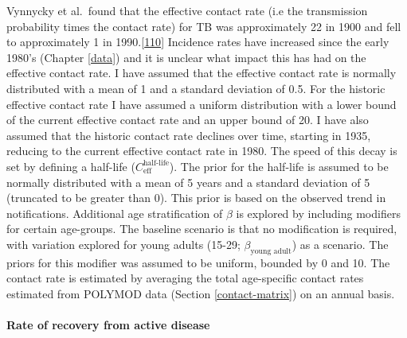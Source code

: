 \documentclass[11pt,twoside]{bristolthesis}
\begin{document}
  Vynnycky et al.~found that the effective contact rate (i.e the transmission probability times the contact rate) for TB was approximately 22 in 1900 and fell to approximately 1 in 1990.{[}\protect\hyperlink{ref-Vynnycky1999}{110}{]} Incidence rates have increased since the early 1980's (Chapter \ref{data}) and it is unclear what impact this has had on the effective contact rate. I have assumed that the effective contact rate is normally distributed with a mean of 1 and a standard deviation of 0.5. For the historic effective contact rate I have assumed a uniform distribution with a lower bound of the current effective contact rate and an upper bound of 20. I have also assumed that the historic contact rate declines over time, starting in 1935, reducing to the current effective contact rate in 1980. The speed of this decay is set by defining a half-life (\(C^{\text{half-life}}_{\text{eff}}\)). The prior for the half-life is assumed to be normally distributed with a mean of 5 years and a standard deviation of 5 (truncated to be greater than 0). This prior is based on the observed trend in notifications. Additional age stratification of \(\beta\) is explored by including modifiers for certain age-groups. The baseline scenario is that no modification is required, with variation explored for young adults (15-29; \(\beta_{\text{young adult}}\)) as a scenario. The priors for this modifier was assumed to be uniform, bounded by 0 and 10. The contact rate is estimated by averaging the total age-specific contact rates estimated from POLYMOD data (Section \ref{contact-matrix}) on an annual basis.
  
  \hypertarget{rate-of-recovery-from-active-disease}{%
  \paragraph{Rate of recovery from active disease}\label{rate-of-recovery-from-active-disease}}
  
\end{document}
